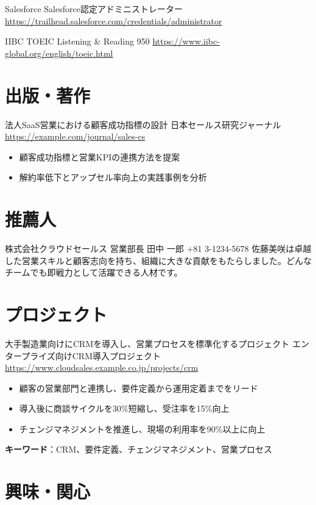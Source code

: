 \documentclass[a4paper, serif, 10pt]{moderncv}
\begin{document}
        {Salesforce}
        {Salesforce認定アドミニストレーター}
        {\url{https://trailhead.salesforce.com/credentials/administrator}}
        {}
        {}

        {IIBC}
        {TOEIC Listening \& Reading 950}
        {\url{https://www.iibc-global.org/english/toeic.html}}
        {}
        {}
\section{出版・著作}

        {法人SaaS営業における顧客成功指標の設計}
        {日本セールス研究ジャーナル}
        {\url{https://example.com/journal/sales-cs}}
        {}
        {\begin{itemize}
\item 顧客成功指標と営業KPIの連携方法を提案
\item 解約率低下とアップセル率向上の実践事例を分析
\end{itemize}}
\section{推薦人}

        {株式会社クラウドセールス 営業部長}
        {田中 一郎}
        {+81 3-1234-5678}
        {}
        {佐藤美咲は卓越した営業スキルと顧客志向を持ち、組織に大きな貢献をもたらしました。どんなチームでも即戦力として活躍できる人材です。}
\section{プロジェクト}

        {大手製造業向けにCRMを導入し、営業プロセスを標準化するプロジェクト}
        {エンタープライズ向けCRM導入プロジェクト}
        {\url{https://www.cloudsales.example.co.jp/projects/crm}}
        {}
        {\begin{itemize}
\item 顧客の営業部門と連携し、要件定義から運用定着までをリード
\item 導入後に商談サイクルを30\%短縮し、受注率を15\%向上
\item チェンジマネジメントを推進し、現場の利用率を90\%以上に向上
\end{itemize}
\textbf{キーワード}：CRM、要件定義、チェンジマネジメント、営業プロセス}
\section{興味・関心}
\end{document}
